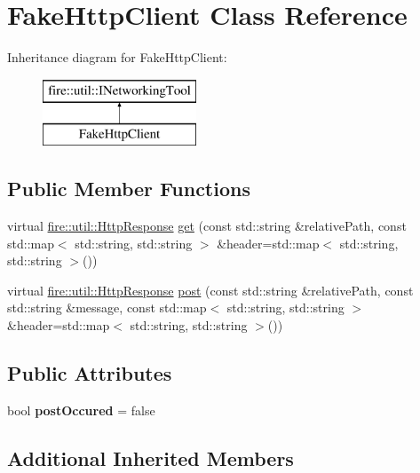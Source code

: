 \hypertarget{a00099}{}\section{Fake\+Http\+Client Class Reference}
\label{a00099}
Inheritance diagram for Fake\+Http\+Client\+:\begin{figure}[H]
\begin{center}
\leavevmode
\includegraphics[height=2.000000cm]{a00099}
\end{center}
\end{figure}
\subsection*{Public Member Functions}
\begin{DoxyCompactItemize}
\item 
virtual \hyperlink{a00140}{fire\+::util\+::\+Http\+Response} \hyperlink{a00099_aa69081dbfa2351dbc9d01434df577568}{get} (const std\+::string \&relative\+Path, const std\+::map$<$ std\+::string, std\+::string $>$ \&header=std\+::map$<$ std\+::string, std\+::string $>$())
\item 
virtual \hyperlink{a00140}{fire\+::util\+::\+Http\+Response} \hyperlink{a00099_af775ada9f2a4e0939f06b733acb5e8ed}{post} (const std\+::string \&relative\+Path, const std\+::string \&message, const std\+::map$<$ std\+::string, std\+::string $>$ \&header=std\+::map$<$ std\+::string, std\+::string $>$())
\end{DoxyCompactItemize}
\subsection*{Public Attributes}
\begin{DoxyCompactItemize}
\item 
bool {\bfseries post\+Occured} = false\hypertarget{a00099_aa4f56c4906c5c5654f05778b97860441}{}\label{a00099_aa4f56c4906c5c5654f05778b97860441}

\end{DoxyCompactItemize}
\subsection*{Additional Inherited Members}


